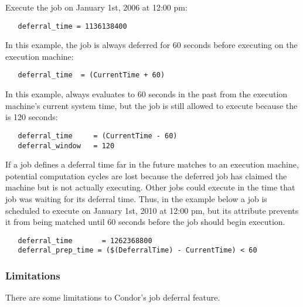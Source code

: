 Execute the job on January 1st, 2006 at 12:00 pm:

\begin{verbatim} 
   deferral_time = 1136138400
\end{verbatim} 

In this example, the job is always deferred for 60 seconds before
executing on the execution machine:

\begin{verbatim} 
   deferral_time  = (CurrentTime + 60)
\end{verbatim}

In this example,  always evaluates to 60 seconds
in the past from the execution machine's current system time, 
but the job is still allowed to execute because 
the  is 120 seconds:

\begin{verbatim} 
   deferral_time     = (CurrentTime - 60)
   deferral_window   = 120
\end{verbatim}

If a job defines a deferral time far in the future 
matches to an execution machine,
potential computation cycles are lost because the deferred job
has claimed the machine but is not actually executing. 
Other jobs could execute in the time that job 
was waiting for its deferral time.
Thus, in the example below a job is scheduled to execute
on January 1st, 2010 at 12:00 pm, 
but its  attribute prevents it 
from being matched until 60 seconds before the job should begin execution. 

\begin{verbatim}
   deferral_time       = 1262368800
   deferral_prep_time = ($(DeferralTime) - CurrentTime) < 60
\end{verbatim}

\subsubsection{Limitations}
\label{sec:jobdeferral-limitations}
There are some limitations to Condor's job deferral feature.

